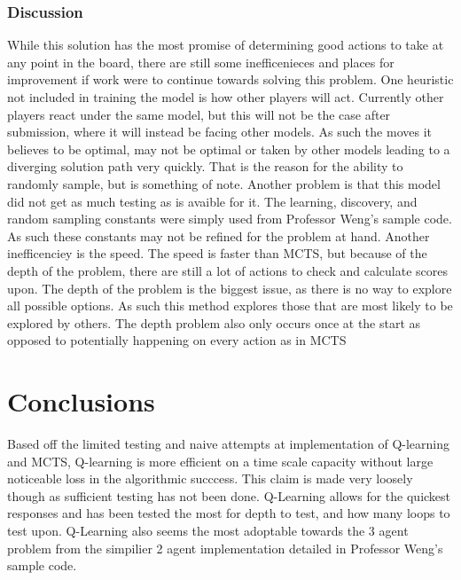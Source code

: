 \documentclass[letterpaper, 10 pt, conference]{ieeeconf}   %
\begin{document}
\subsubsection{Discussion}
While this solution has the most promise of determining good actions to take at any point in the board, there are still some inefficenieces and places for improvement if
work were to continue towards solving this problem. One heuristic not included in training the model is how other players will act.
Currently other players react under the same model, but this will not be the case after submission, where it will instead be facing other models. As such
the moves it believes to be optimal, may not be optimal or taken by other models leading to a diverging solution path very quickly.
That is the reason for the ability to randomly sample, but is something of note. Another problem is that this model did not get as much testing as is avaible for it.
The learning, discovery, and random sampling constants were simply used from Professor Weng's sample code. As such
these constants may not be refined for the problem at hand. Another inefficenciey is the speed. The speed is faster than MCTS, but because of the depth of the problem,
there are still a lot of actions to check and calculate scores upon. The depth of the problem is the biggest issue, as there is no way to explore all possible options. As such
this method explores those that are most likely to be explored by others. The depth problem also only occurs once at the start as opposed to potentially happening on every action
as in MCTS
\section{Conclusions}
Based off the limited testing and naive attempts at implementation of Q-learning and MCTS, Q-learning is more efficient on a time scale capacity without
large noticeable loss in the algorithmic succcess. This claim is made very loosely though as sufficient testing has not been done. Q-Learning allows for the quickest responses
and has been tested the most for depth to test, and how many loops to test upon. Q-Learning also seems the most adoptable towards the 3 agent problem from the simpilier
2 agent implementation detailed in Professor Weng's sample code.
\end{document}
